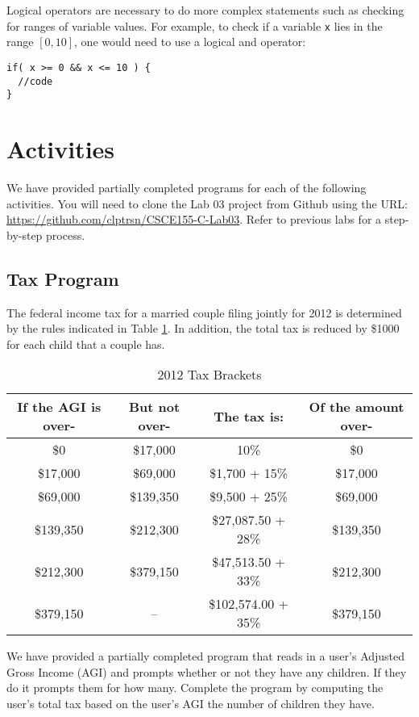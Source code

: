 \documentclass[12pt]{scrartcl}
\begin{document}
Logical operators are necessary to do more complex statements such as 
checking for ranges of variable values.  For example, to check if a variable 
\texttt{x} lies in the range $[0, 10]$, one would need to use a logical and operator:

\begin{verbatim}
if( x >= 0 && x <= 10 ) { 
  //code
}
\end{verbatim}

\section{Activities}

We have provided partially completed programs for each of the following 
activities.  You will need to clone the Lab 03 project from Github using the URL:
\url{https://github.com/clptrsn/CSCE155-C-Lab03}.  Refer to previous
labs for a step-by-step process.

\subsection{Tax Program}

The federal income tax for a married couple filing jointly for 2012 is determined 
by the rules indicated in Table \ref{table:taxBrackets}.  In addition, the total tax is reduced by 
\$1000 for each child that a couple has.  

\begin{table}
\centering
\begin{tabular}{c|c|c|c}
If the AGI is over- & But not over- & The tax is: & Of the amount over- \\
\hline\hline
\$0 & \$17,000 & 10\% & \$0 \\
\$17,000 & \$69,000 & \$1,700 + 15\% & \$17,000 \\
\$69,000 & \$139,350 & \$9,500 + 25\% & \$69,000 \\
\$139,350 & \$212,300 & \$27,087.50 + 28\% & \$139,350 \\
\$212,300 & \$379,150 & \$47,513.50 + 33\% & \$212,300 \\
\$379,150 & --  & \$102,574.00 + 35\% & \$379,150 \\
\end{tabular}
\caption{2012 Tax Brackets}
\label{table:taxBrackets}
\end{table}

We have provided a partially completed program that reads in a user's 
Adjusted Gross Income (AGI) and prompts whether or not they have 
any children.  If they do it prompts them for how many.  Complete
the program by computing the user's total tax based on the user's AGI 
the number of children they have.
\end{document}

